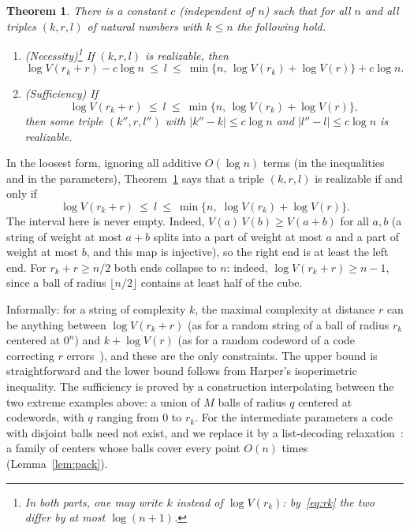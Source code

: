 \documentclass[11pt,a4paper]{article}
\newtheorem{theorem}{Theorem}
\theoremstyle{definition}
\renewcommand{\le}{\leqslant}
\renewcommand{\ge}{\geqslant}
\begin{document}
\begin{theorem}\label{th:triples}
There is a constant $c$ (independent of $n$) such that for all $n$ and all
triples $(k,r,l)$ of natural numbers with $k\le n$ the following hold.
\begin{enumerate}
\item[(a)] \textup{(Necessity)}\footnote{In both parts, one may write $k$
  instead of $\log V(r_k)$: by~\eqref{eq:rk} the two differ by at most
  $\log(n+1)$.} If $(k,r,l)$ is realizable, then
  \[
    \log V(r_k+r)-c\log n\ \le\ l\ \le\
    \min\{n,\,\log V(r_k)+\log V(r)\}+c\log n .
  \]
\item[(b)] \textup{(Sufficiency)} If
  \[
    \log V(r_k+r)\ \le\ l\ \le\ \min\{n,\,\log V(r_k)+\log V(r)\},
  \]
  then some triple $(k'',r,l'')$ with $|k''-k|\le c\log n$ and $|l''-l|\le
  c\log n$ is realizable.
\end{enumerate}
\end{theorem}

In the loosest form, ignoring all additive $O(\log n)$ terms (in the
inequalities and in the parameters), Theorem~\ref{th:triples} says that a
triple $(k,r,l)$ is realizable if and only if
\[
  \log V(r_k+r)\ \le\ l\ \le\ \min\{n,\;\log V(r_k)+\log V(r)\} .
\]
The interval here is never empty.
Indeed, $V(a)\,V(b)\ge V(a+b)$ for all $a,b$ (a string of weight at most $a+b$
splits into a part of weight at most $a$ and a part of weight at most $b$, and
this map is injective), so the right end is at least the left end. %
For $r_k+r\ge n/2$ both ends collapse to $n$: indeed, $\log V(r_k+r)\ge n-1$,
since a ball of radius $\lfloor n/2\rfloor$ contains at least half of the cube.

Informally: for a string of complexity $k$, the maximal complexity at distance
$r$ can be anything between $\log V(r_k+r)$ (as for a random string of a ball of
radius $r_k$ centered at $0^n$) and $k+\log V(r)$ (as for a random codeword of a
code correcting $r$ errors~\cite{MS77}), and these are the only constraints. The
upper bound is straightforward and the lower bound follows from Harper's
isoperimetric inequality. The sufficiency is proved by a construction
interpolating between the two extreme examples above: a union of $M$ balls of
radius $q$ centered at codewords, with $q$ ranging from $0$ to $r_k$. For the
intermediate parameters a code with disjoint balls need not exist, and we
replace it by a list-decoding relaxation~\cite{Elias57,Guruswami04}: a family of
centers whose balls cover every point $O(n)$ times (Lemma~\ref{lem:pack}). 
\end{document}

